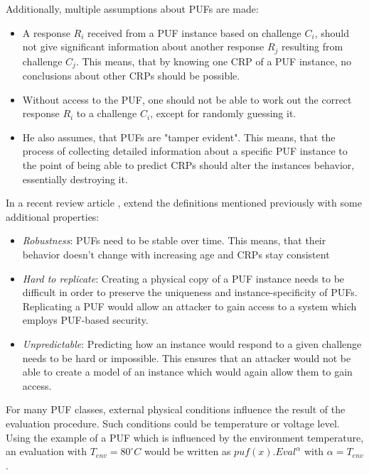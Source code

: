 Additionally, multiple assumptions about PUFs are made:
\begin{itemize}
    \item A response $R_i$ received from a PUF instance based on challenge $C_i$, should not give significant
          information about another response $R_j$ resulting from challenge $C_j$.
          This means, that by knowing one \ac{CRP} of a PUF instance, no conclusions about other \acp{CRP}
          should be possible.
    \item Without access to the PUF, one should not be able to work out the correct response $R_i$ to a challenge
          $C_i$, except for randomly guessing it.
    \item He also assumes, that PUFs are "tamper evident". This means, that the process of
          collecting detailed information about a specific PUF instance to the point of being able to predict \acp{CRP} should
          alter the instances behavior, essentially destroying it.
\end{itemize}

In a recent review article \cite{McGrath2019}, \citeauthor*{McGrath2019} extend the definitions mentioned previously
with some additional properties:
\begin{itemize}
    \item \emph{Robustness}: PUFs need to be stable over time. This means, that their behavior doesn't change with
          increasing age and \acp{CRP} stay consistent
    \item \emph{Hard to replicate}: Creating a physical copy of a PUF instance needs to be difficult in order to
          preserve the uniqueness and instance-specificity of PUFs.
          Replicating a PUF would allow an attacker to gain access to a system which employs PUF-based security.
    \item \emph{Unpredictable}: Predicting how an instance would respond to a given challenge needs to be hard or impossible.
          This ensures that an attacker would not be able to create a model of an instance which would again
          allow them to gain access.
\end{itemize}

For many PUF classes, external physical conditions influence the result of the evaluation procedure.
Such conditions could be temperature or voltage level.
Using the example of a PUF which is influenced by the environment temperature, an evaluation with
$T_{env} = 80^{\circ}C$ would be written as $puf(x).Eval^\alpha$ with $\alpha = T_{env}$. \cite[][p. 15]{Maes2013}

